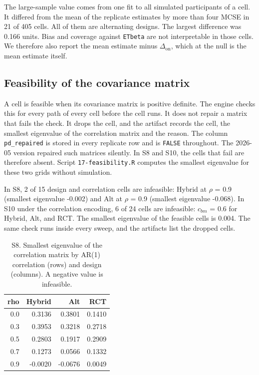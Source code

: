 \documentclass[
  11pt,
]{article}
\begin{document}
The large-sample value comes from one fit to all simulated participants of a cell. It differed from the mean of the replicate estimates by more than four MCSE in 21 of 405 cells. All of them are alternating designs. The largest difference was 0.166 units. Bias and coverage against \texttt{ETbeta} are not interpretable in those cells. We therefore also report the mean estimate minus \(\Delta_{\mathrm{on}}\), which at the null is the mean estimate itself.

\subsection{Feasibility of the covariance matrix}\label{feasibility-of-the-covariance-matrix}

A cell is feasible when its covariance matrix is positive definite. The engine checks this for every path of every cell before the cell runs. It does not repair a matrix that fails the check. It drops the cell, and the artifact records the cell, the smallest eigenvalue of the correlation matrix and the reason. The column \texttt{pd\_repaired} is stored in every replicate row and is \texttt{FALSE} throughout. The 2026-05 version repaired such matrices silently. In S8 and S10, the cells that fail are therefore absent. Script \texttt{17-feasibility.R} computes the smallest eigenvalue for these two grids without simulation.

In S8, 2 of 15 design and correlation cells are infeasible: Hybrid at \(\rho\) = 0.9 (smallest eigenvalue -0.002) and Alt at \(\rho\) = 0.9 (smallest eigenvalue -0.068). In S10 under the correlation encoding, 6 of 24 cells are infeasible: \(c_{bm}\) = 0.6 for Hybrid, Alt, and RCT. The smallest eigenvalue of the feasible cells is 0.004. The same check runs inside every sweep, and the artifacts list the dropped cells.

\begin{table}

\caption{\label{tab:feas-tab-s8}S8. Smallest eigenvalue of the correlation matrix by AR(1) correlation (rows) and design (columns). A negative value is infeasible.}
\centering
\begin{tabular}[t]{rrrr}
\toprule
rho & Hybrid & Alt & RCT\\
\midrule
0.0 & 0.3136 & 0.3801 & 0.1410\\
0.3 & 0.3953 & 0.3218 & 0.2718\\
0.5 & 0.2803 & 0.1917 & 0.2909\\
0.7 & 0.1273 & 0.0566 & 0.1332\\
0.9 & -0.0020 & -0.0676 & 0.0049\\
\bottomrule
\end{tabular}
\end{table}
\end{document}
